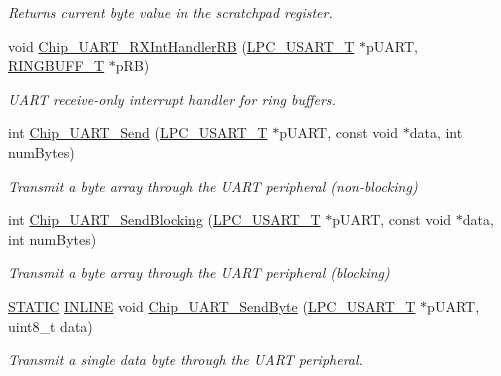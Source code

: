\begin{DoxyCompactItemize}
\begin{DoxyCompactList}\small\item\em Returns current byte value in the scratchpad register. \end{DoxyCompactList}\item 
void \hyperlink{group__UART__17XX__40XX_gafdd19a312a2bed6ff1ccb47d5b68c248}{Chip\+\_\+\+U\+A\+R\+T\+\_\+\+R\+X\+Int\+Handler\+RB} (\hyperlink{structLPC__USART__T}{L\+P\+C\+\_\+\+U\+S\+A\+R\+T\+\_\+T} $\ast$p\+U\+A\+RT, \hyperlink{structRINGBUFF__T}{R\+I\+N\+G\+B\+U\+F\+F\+\_\+T} $\ast$p\+RB)
\begin{DoxyCompactList}\small\item\em U\+A\+RT receive-\/only interrupt handler for ring buffers. \end{DoxyCompactList}\item 
int \hyperlink{group__UART__17XX__40XX_gacbd726b1450510892272857e43854c4c}{Chip\+\_\+\+U\+A\+R\+T\+\_\+\+Send} (\hyperlink{structLPC__USART__T}{L\+P\+C\+\_\+\+U\+S\+A\+R\+T\+\_\+T} $\ast$p\+U\+A\+RT, const void $\ast$data, int num\+Bytes)
\begin{DoxyCompactList}\small\item\em Transmit a byte array through the U\+A\+RT peripheral (non-\/blocking) \end{DoxyCompactList}\item 
int \hyperlink{group__UART__17XX__40XX_gad2e45d820abdd0e1790ebd61938c100a}{Chip\+\_\+\+U\+A\+R\+T\+\_\+\+Send\+Blocking} (\hyperlink{structLPC__USART__T}{L\+P\+C\+\_\+\+U\+S\+A\+R\+T\+\_\+T} $\ast$p\+U\+A\+RT, const void $\ast$data, int num\+Bytes)
\begin{DoxyCompactList}\small\item\em Transmit a byte array through the U\+A\+RT peripheral (blocking) \end{DoxyCompactList}\item 
\hyperlink{group__LPC__Types__Public__Macros_ga10b2d890d871e1489bb02b7e70d9bdfb}{S\+T\+A\+T\+IC} \hyperlink{group__LPC__Types__Public__Types_ga2eb6f9e0395b47b8d5e3eeae4fe0c116}{I\+N\+L\+I\+NE} void \hyperlink{group__UART__17XX__40XX_gaa600b8621d1425b1b493238a68f38088}{Chip\+\_\+\+U\+A\+R\+T\+\_\+\+Send\+Byte} (\hyperlink{structLPC__USART__T}{L\+P\+C\+\_\+\+U\+S\+A\+R\+T\+\_\+T} $\ast$p\+U\+A\+RT, uint8\+\_\+t data)
\begin{DoxyCompactList}\small\item\em Transmit a single data byte through the U\+A\+RT peripheral. \end{DoxyCompactList}\item 

\end{DoxyCompactItemize}
